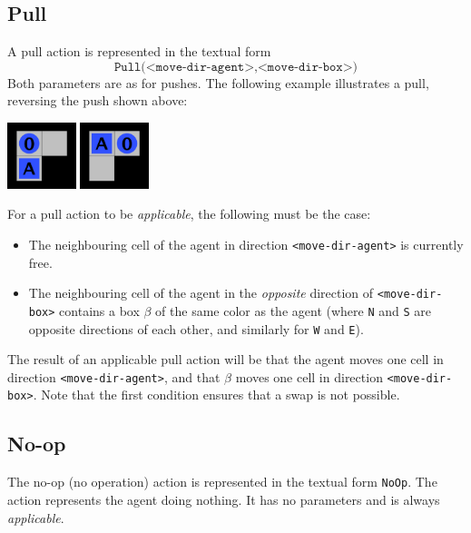 \documentclass[12pt,a4paper]{article}
\begin{document}
\subsection{Pull} A pull action is represented in the textual form
    \[
        \texttt{Pull(<move-dir-agent>,<move-dir-box>)}
    \]
    Both parameters are as for pushes. The following example illustrates a pull, reversing the push shown above:
    \begin{center}
       \includegraphics[width=2cm]{action_example2} \quad
         \quad  
         \includegraphics[width=2cm]{action_example1}
    \end{center}
    For a pull action to be \emph{applicable}, the following must be the case:
    \begin{itemize}
        \item The neighbouring cell of the agent in direction \texttt{<move-dir-agent>} is currently free.
        \item The neighbouring cell of the agent in the \emph{opposite} direction of \texttt{<move-dir-box>} contains a box $\beta$ of the same color as the agent (where \texttt{N} and \texttt{S} are opposite directions of each other, and similarly for \texttt{W} and \texttt{E}).
    \end{itemize}
    The result of an applicable pull action will be that the agent moves one cell in direction \texttt{<move-dir-agent>}, and that $\beta$ moves one cell in direction \texttt{<move-dir-box>}. Note that the first condition ensures that a swap is not possible.
   
\subsection{No-op} The no-op (no operation) action is represented in the textual form \texttt{NoOp}. The action represents the agent doing nothing. It has no parameters and is always \emph{applicable}.
\end{document}
